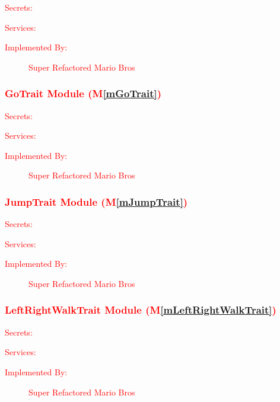 \documentclass[12pt, titlepage]{article}
\newcommand{\mref}[1]{M\ref{#1}}
\begin{document}
\begin{description}
\item[\textcolor{red}{Secrets:}] \textcolor{red}{}
\item[\textcolor{red}{Services:}] \textcolor{red}{}
\item[\textcolor{red}{Implemented By:}] \textcolor{red}{Super Refactored Mario Bros}
\end{description}

\subsubsection{\textcolor{red}{GoTrait Module (\mref{mGoTrait})}}

\begin{description}
\item[\textcolor{red}{Secrets:}] \textcolor{red}{}
\item[\textcolor{red}{Services:}] \textcolor{red}{}
\item[\textcolor{red}{Implemented By:}] \textcolor{red}{Super Refactored Mario Bros}
\end{description}

\subsubsection{\textcolor{red}{JumpTrait Module (\mref{mJumpTrait})}}

\begin{description}
\item[\textcolor{red}{Secrets:}] \textcolor{red}{}
\item[\textcolor{red}{Services:}] \textcolor{red}{}
\item[\textcolor{red}{Implemented By:}] \textcolor{red}{Super Refactored Mario Bros}
\end{description}

\subsubsection{\textcolor{red}{LeftRightWalkTrait Module (\mref{mLeftRightWalkTrait})}}

\begin{description}
\item[\textcolor{red}{Secrets:}] \textcolor{red}{}
\item[\textcolor{red}{Services:}] \textcolor{red}{}
\item[\textcolor{red}{Implemented By:}] \textcolor{red}{Super Refactored Mario Bros}
\end{description}
\end{document}
